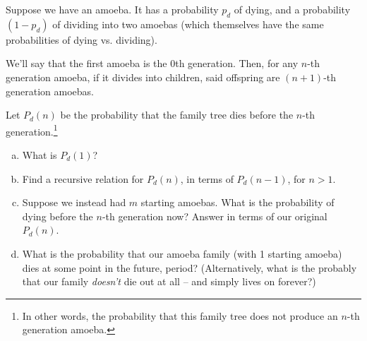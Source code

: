 \begin{problem}
\begin{enumerate}[(a)]





\end{enumerate}
\end{problem}



\begin{problem}
\label{pr:amoeba-ngen}
Suppose we have an amoeba. It has a probability $p_d$ of dying, and a probability $(1 - p_d)$ of dividing into two amoebas (which themselves have the same probabilities of dying vs. dividing). 

We'll say that the first amoeba is the 0th generation. Then, for any $n$-th generation amoeba, if it divides into children, said offspring are $(n+1)$-th generation amoebas. 

Let $P_d(n)$ be the probability that the family tree dies before the $n$-th generation.\footnote{In other words, the probability that this family tree does not produce an $n$-th generation amoeba.}


\begin{enumerate}[(a)]
\item What is $P_d(1)$?
\item Find a recursive relation for $P_d(n)$, in terms of $P_d(n-1)$, for $n > 1$. 
\item Suppose we instead had $m$ starting amoebas. What is the probability of dying before the $n$-th generation now? Answer in terms of our original $P_d(n)$.
\item What is the probability that our amoeba family (with 1 starting amoeba) dies at some point in the future, period? (Alternatively, what is the probably that our family \emph{doesn't} die out at all -- and simply lives on forever?) %
\end{enumerate}
\hfill
\end{problem}


